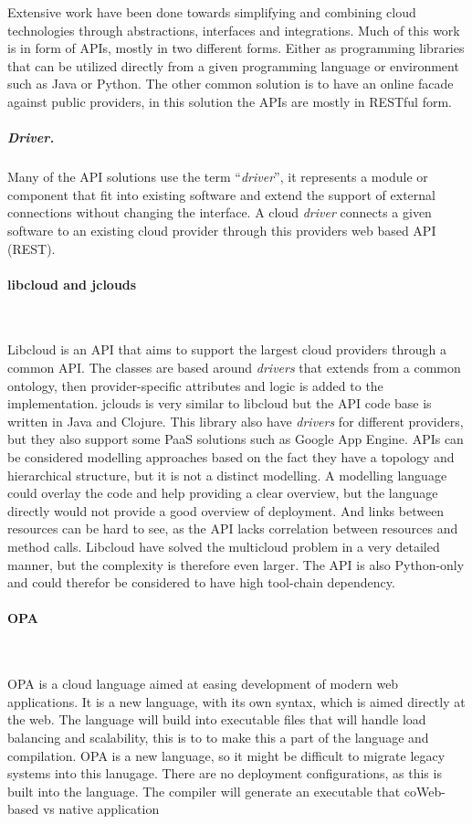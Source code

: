 Extensive work have been done towards simplifying and combining cloud technologies through
abstractions, interfaces and integrations.
Much of this work is in form of APIs, mostly in two different forms.
Either as programming libraries that can be utilized directly from a given 
programming language or environment such as Java or Python.
The other common solution is to have an online facade against public providers,
in this solution the APIs are mostly in RESTful form.

\subparagraph{Driver.}

Many of the API solutions use the term ``\emph{driver}'', it represents
a module or component that fit into existing software and extend the support
of external connections without changing the interface.
A cloud \emph{driver} connects a given software to an existing cloud provider
through this providers web based API (REST).

\paragraph{libcloud and jclouds}~\cite{libcloud, jclouds}

Libcloud is an API that aims to support the largest cloud providers through a common API. 
The classes are based around \emph{drivers} that extends from a common ontology, then provider-specific attributes and logic is added to the implementation.
jclouds is very similar to libcloud but the API code base is written in Java and Clojure. 
This library also have \emph{drivers} for different providers, but they also support some PaaS solutions such as Google App Engine.
APIs can be considered modelling approaches based on the fact they have a topology and hierarchical structure, 
but it is not a distinct modelling. A modelling language could overlay the code and help providing a clear overview, 
but the language directly would not provide a good overview of deployment. 
And links between resources can be hard to see, as the API lacks correlation between resources and method calls. 
Libcloud have solved the multicloud problem in a very detailed manner, but the complexity is therefore even larger. 
The API is also Python-only and could therefor be considered to have high tool-chain dependency.

\paragraph{OPA}~\cite{opa}

OPA is a cloud language aimed at easing development of modern web applications. It is a new language, 
with its own syntax, which is aimed directly at the web. The language will build into executable files that will handle load balancing and scalability, 
this is to to make this a part of the language and compilation.
OPA is a new language, so it might be difficult to migrate legacy systems into this lanugage. 
There are no deployment configurations, as this is built into the language. The compiler will generate an executable that coWeb-based vs native application

